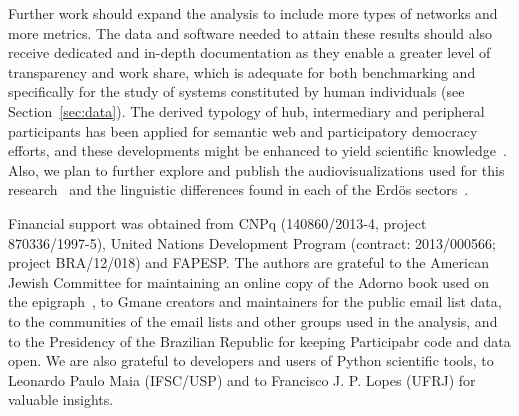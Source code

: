 \documentclass[%
aip,
jmp,%
amsmath,amssymb,
reprint,%
]{revtex4-1}
\begin{document}
Further work should expand the analysis to include
more types of networks and more metrics.
The data and software needed to attain these results
should also receive dedicated and in-depth
documentation as they enable a greater level of transparency
and work share,
which is adequate for both benchmarking
and specifically for the study of systems constituted
by human individuals (see Section~\ref{sec:data}).
The derived typology of hub, intermediary and peripheral participants
has been applied for semantic web and participatory democracy efforts,
and these developments might be enhanced to yield scientific knowledge~\cite{opa}.
Also, we plan to further explore and publish the audiovisualizations
used for this research~\cite{versinus,animacoes} and
the linguistic differences found in each of the Erd\"os sectors~\cite{rcText}.


% 
% 



\begin{acknowledgments}
Financial support was obtained from CNPq (140860/2013-4,
project 870336/1997-5), United Nations Development Program (contract: 2013/000566; project BRA/12/018) and FAPESP. 
The authors are grateful to the American Jewish Committee for maintaining an online copy of the Adorno book used on the epigraph~\cite{adorno}, to Gmane creators and maintainers for the public email list data, to the communities of the email lists and other groups used in the analysis, and to the Presidency of the Brazilian Republic for keeping Participabr code and data open.
We are also grateful to developers and users of Python scientific tools, to Leonardo Paulo Maia (IFSC/USP) and to Francisco J. P. Lopes (UFRJ) for valuable insights.
\end{acknowledgments}
\end{document}
